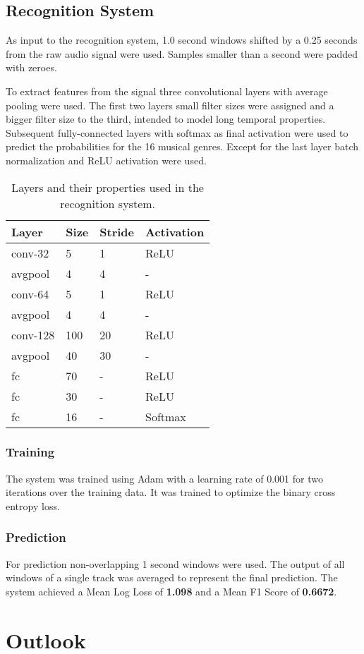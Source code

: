 \documentclass[11pt]{article}
\begin{document}
\subsection{Recognition System}
As input to the recognition system,  1.0 second windows shifted by a 0.25 seconds from the raw audio signal were used. Samples smaller than a second were padded with zeroes.

To extract features from the signal three convolutional layers with average pooling were used. The first two layers small filter sizes were assigned and a bigger filter size to the third, intended to model long temporal properties. Subsequent fully-connected layers with softmax as final activation were used to predict the probabilities for the 16 musical genres. Except for the last layer batch normalization and ReLU activation were used.

\begin{table}[h]
	\begin{center}
		\begin{tabular}{|l|l|l|l|}
			
			\hline
			Layer & Size & Stride & Activation  \\
			\hline\hline
			conv-32 & 5 & 1 & ReLU \\
			avgpool & 4 & 4 & - \\
			conv-64 & 5 & 1 & ReLU \\
			avgpool & 4 & 4 & - \\
			conv-128 & 100 & 20 & ReLU \\
			avgpool & 40 & 30 & - \\
			fc & 70 & - & ReLU \\
			fc & 30 & - & ReLU \\
			fc & 16 & - & Softmax \\
			\hline
			
		\end{tabular}
		\caption{Layers and their properties used in the recognition system.}\label{table-6}
	\end{center}
\end{table}

\subsubsection{Training}
The system was trained using Adam with a learning rate of 0.001 for two iterations over the training data. It was trained to optimize the binary cross entropy loss.

\subsubsection{Prediction}
For prediction non-overlapping 1 second windows were used. The output of all windows of a single track was averaged to represent the final prediction. The system achieved a Mean Log Loss of \textbf{1.098} and a Mean F1 Score of \textbf{0.6672}.

\section{Outlook}




\end{document}

